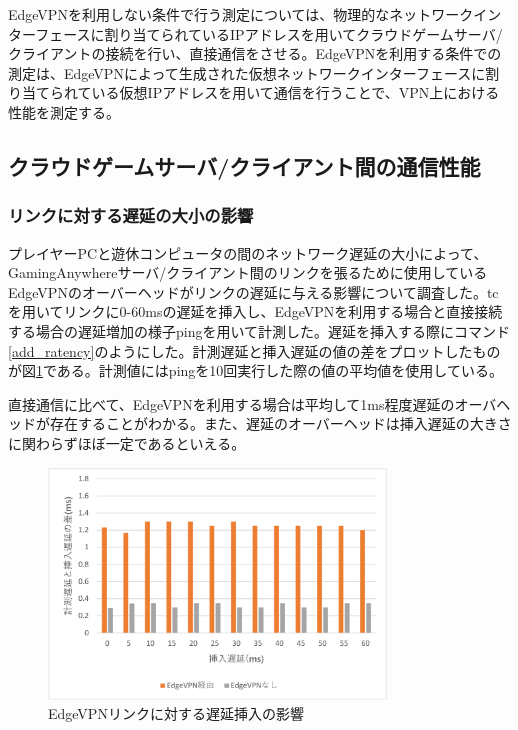 EdgeVPNを利用しない条件で行う測定については、物理的なネットワークインターフェースに割り当てられているIPアドレスを用いてクラウドゲームサーバ/クライアントの接続を行い、直接通信をさせる。EdgeVPNを利用する条件での測定は、EdgeVPNによって生成された仮想ネットワークインターフェースに割り当てられている仮想IPアドレスを用いて通信を行うことで、VPN上における性能を測定する。

\subsection{クラウドゲームサーバ/クライアント間の通信性能}

\subsubsection{リンクに対する遅延の大小の影響}
プレイヤーPCと遊休コンピュータの間のネットワーク遅延の大小によって、GamingAnywhereサーバ/クライアント間のリンクを張るために使用しているEdgeVPNのオーバーヘッドがリンクの遅延に与える影響について調査した。tc\cite{iproute2}を用いてリンクに0-60msの遅延を挿入し、EdgeVPNを利用する場合と直接接続する場合の遅延増加の様子ping\cite{ping}を用いて計測した。遅延を挿入する際にコマンド\ref{add_ratency}のようにした。計測遅延と挿入遅延の値の差をプロットしたものが図\ref{fig:ratency}である。計測値にはpingを10回実行した際の値の平均値を使用している。

直接通信に比べて、EdgeVPNを利用する場合は平均して1ms程度遅延のオーバヘッドが存在することがわかる。また、遅延のオーバーヘッドは挿入遅延の大きさに関わらずほぼ一定であるといえる。

\begin{figure}[h!]
    \centering
    \includegraphics[width=0.8\textwidth,keepaspectratio,clip]{img/graph_ratency.pdf}
    \caption{EdgeVPNリンクに対する遅延挿入の影響}
    \label{fig:ratency}
\end{figure}

